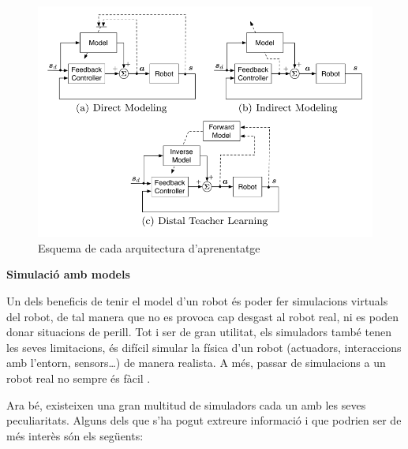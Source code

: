 \documentclass[12pt,a4paper,final,twoside]{article}
\begin{document}
\begin{figure}[tb]
\begin{center}
\includegraphics[scale=0.5]{Imatges/arquitectures-d'aprenentatge.png}
\caption{Esquema de cada arquitectura d'aprenentatge \cite{Nguyen-Tuong2011}\label{fig:esquema-arquitectures-models}}
\end{center}
\end{figure}

\vspace{20pt}
\textbf{Simulació amb models}

Un dels beneficis de tenir el model d'un robot és poder fer simulacions virtuals del robot, de tal manera que no es provoca cap desgast al robot real, ni es poden donar situacions de perill. Tot i ser de gran utilitat, els simuladors també tenen les seves limitacions, és difícil simular la física d'un robot (actuadors, interaccions amb l'entorn, sensors\dots) de manera realista. A més, passar de simulacions a un robot real no sempre és fàcil \cite{Hohl2006}.

Ara bé, existeixen una gran multitud de simuladors cada un amb les seves peculiaritats. Alguns dels que s'ha pogut extreure informació i que podrien ser de més interès són els següents:
\end{document}
